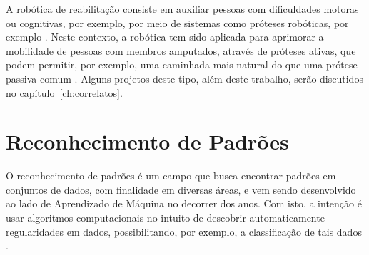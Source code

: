 A robótica de reabilitação consiste em auxiliar pessoas com dificuldades motoras ou cognitivas, por exemplo, por meio de sistemas como próteses robóticas, por exemplo \cite{siciliano:2008}. Neste contexto, a robótica tem sido aplicada para aprimorar a mobilidade de pessoas com membros amputados, através de próteses ativas, que podem permitir, por exemplo, uma caminhada mais natural do que uma prótese passiva comum \cite{dedic:2011}. Alguns projetos deste tipo, além deste trabalho, serão discutidos no capítulo~\ref{ch:correlatos}.







\section{Reconhecimento de Padrões}
\label{sec:patternrec}
O reconhecimento de padrões é um campo que busca encontrar padrões em conjuntos de dados, com finalidade em diversas áreas, e vem sendo desenvolvido ao lado de Aprendizado de Máquina no decorrer dos anos. Com isto, a intenção é usar algoritmos computacionais no intuito de descobrir automaticamente regularidades em dados, possibilitando, por exemplo, a classificação de tais dados \cite{bishop:2006}.

